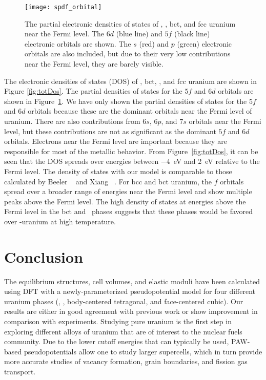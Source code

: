 \begin{figure}
	\centering
	\texttt{[image: spdf\_orbital]}
    \caption[The partial electronic densities of states of \textalpha,
      \textgamma, bct, and fcc uranium near the Fermi level.]{The partial electronic densities of states of \textalpha,
      \textgamma, bct, and fcc uranium near the Fermi level. The $6d$ (blue
      line) and $5f$ (black line) electronic orbitals are shown. The $s$ (red)
      and $p$ (green) electronic orbitals are also included, but due to their
      very low contributions near the Fermi level, they are barely visible.}
	\label{fig:fdorbitals}
\end{figure}

The electronic densities of states (DOS) of \textalpha, bct, \textgamma, and
fcc uranium are shown in Figure \ref{fig:totDos}. The partial densities of
states for the $5f$ and $6d$ orbitals are shown in Figure~\ref{fig:fdorbitals}.
We have only shown the partial densities of states for the $5f$ and $6d$
orbitals because these are the dominant orbitals near the Fermi level of
uranium. There are also contributions from $6s$, $6p$, and $7s$ orbitals near
the Fermi level, but these contributions are not as significant as the dominant
$5f$ and $6d$ orbitals.
Electrons near the Fermi level
are important because they are responsible for most of the metallic behavior.
From Figure~\ref{fig:totDos}, it can be seen that the DOS spreads over energies
between $-4$~eV and 2~eV relative to the Fermi level. The density of states
with our model is comparable to those calculated by Beeler
\etal~\cite{beeler2013first} and Xiang \etal~\cite{xiang2008quantum}.
For bcc and bct uranium, the $f$ orbitals spread over a broader range of
energies near the Fermi level and show multiple peaks above the Fermi level.
The high density of states at energies above the Fermi level in the bct
and \textgamma\ phases suggests that these phases would be favored over
\textalpha-uranium at high temperature.

\section{Conclusion}
The equilibrium structures, cell volumes, and elastic moduli have been
calculated using DFT with a newly-parameterized pseudopotential model for four
different uranium phases (\textalpha, \textgamma, body-centered
tetragonal, and face-centered cubic). Our results are either in good agreement
with previous work or show improvement in comparison with experiments.
Studying pure uranium is the first step in exploring different alloys of
uranium that are of interest to the nuclear fuels community.
Due to the lower cutoff energies that can typically be used, PAW-based
pseudopotentials allow one to study larger supercells, which in turn provide
more accurate studies of vacancy formation, grain boundaries, and fission gas
transport.

